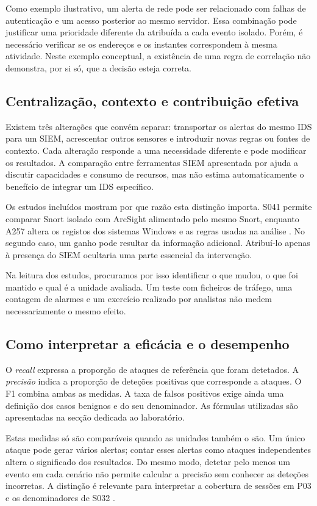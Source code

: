 \documentclass[11pt,a4paper]{article}
\begin{document}
Como exemplo ilustrativo, um alerta de rede pode ser relacionado com falhas de autenticação e um acesso posterior ao mesmo servidor. Essa combinação pode justificar uma prioridade diferente da atribuída a cada evento isolado. Porém, é necessário verificar se os endereços e os instantes correspondem à mesma atividade. Neste exemplo conceptual, a existência de uma regra de correlação não demonstra, por si só, que a decisão esteja correta.

\subsection{Centralização, contexto e contribuição efetiva}
Existem três alterações que convém separar: transportar os alertas do mesmo IDS para um SIEM, acrescentar outros sensores e introduzir novas regras ou fontes de contexto. Cada alteração responde a uma necessidade diferente e pode modificar os resultados. A comparação entre ferramentas SIEM apresentada por \citet{manzoor2024} ajuda a discutir capacidades e consumo de recursos, mas não estima automaticamente o benefício de integrar um IDS específico.

Os estudos incluídos mostram por que razão esta distinção importa. S041 permite comparar Snort isolado com ArcSight alimentado pelo mesmo Snort, enquanto A257 altera os registos dos sistemas Windows e as regras usadas na análise \citep{negi2021,uetz2021}. No segundo caso, um ganho pode resultar da informação adicional. Atribuí-lo apenas à presença do SIEM ocultaria uma parte essencial da intervenção.

Na leitura dos estudos, procuramos por isso identificar o que mudou, o que foi mantido e qual é a unidade avaliada. Um teste com ficheiros de tráfego, uma contagem de alarmes e um exercício realizado por analistas não medem necessariamente o mesmo efeito.

\subsection{Como interpretar a eficácia e o desempenho}
O \textit{recall} expressa a proporção de ataques de referência que foram detetados. A \textit{precisão} indica a proporção de deteções positivas que corresponde a ataques. O F1 combina ambas as medidas. A taxa de falsos positivos exige ainda uma definição dos casos benignos e do seu denominador. As fórmulas utilizadas são apresentadas na secção dedicada ao laboratório.

Estas medidas só são comparáveis quando as unidades também o são. Um único ataque pode gerar vários alertas; contar esses alertas como ataques independentes altera o significado dos resultados. Do mesmo modo, detetar pelo menos um evento em cada cenário não permite calcular a precisão sem conhecer as deteções incorretas. A distinção é relevante para interpretar a cobertura de sessões em P03 e os denominadores de S032 \citep{suryayusra2026,wazuhtelegram2026}.
\end{document}
